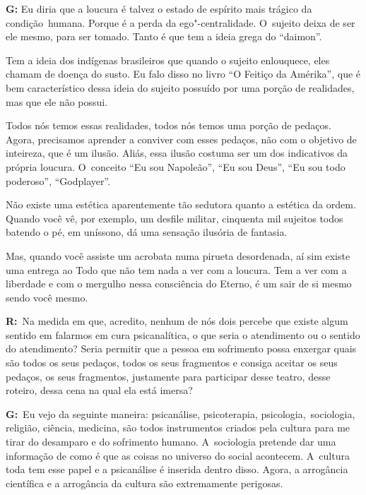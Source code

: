  

\textbf{G:} Eu diria que a loucura é talvez o estado de espírito mais
trágico da condição\textbf{}~humana. Porque é a perda da
ego"-centralidade. O~sujeito deixa de ser ele mesmo, para ser tomado.
Tanto é que tem a ideia grega do ``daimon''.

 

Tem a ideia dos indígenas brasileiros que quando o sujeito enlouquece,
eles chamam de doença do susto. Eu falo disso no livro ``O Feitiço da
Amérika'', que é bem característico dessa ideia do sujeito possuído
por uma porção de realidades, mas que ele não possui.

 

Todos nós temos essas realidades, todos nós temos uma porção de pedaços.
Agora, precisamos aprender a conviver com esses pedaços, não com o
objetivo de inteireza, que é um ilusão. Aliás, essa ilusão costuma ser
um dos indicativos da própria loucura. O~conceito ``Eu sou
Napoleão'', ``Eu sou Deus'', ``Eu sou todo poderoso'', ``Godplayer''.

 

Não existe uma estética aparentemente tão sedutora quanto a estética da
ordem. Quando você vê, por exemplo, um desfile militar, cinquenta mil
sujeitos todos batendo o pé, em uníssono, dá uma sensação ilusória de
fantasia.

 

Mas, quando você assiste um acrobata numa pirueta desordenada, aí sim
existe uma entrega ao Todo que não tem nada a ver com a loucura. Tem a
ver com a liberdade e com o mergulho nessa consciência do Eterno, é um
sair de si mesmo sendo você mesmo.

 

\textbf{R:}~Na medida em que, acredito, nenhum de nós dois percebe que
existe algum sentido em falarmos em cura psicanalítica, o que seria o
atendimento ou o sentido do atendimento? Seria permitir que a pessoa em
sofrimento possa enxergar quais são todos os seus pedaços, todos os seus
fragmentos e consiga aceitar os seus pedaços, os seus fragmentos,
justamente para participar desse teatro, desse roteiro, dessa cena na
qual ela está imersa?

 

\textbf{G:}~Eu vejo da seguinte maneira: psicanálise, psicoterapia,
psicologia,\textbf{}~sociologia, religião, ciência, medicina, são todos
instrumentos criados pela cultura para me tirar do desamparo e do
sofrimento humano. A~sociologia pretende dar uma informação de como é
que as coisas no universo do social acontecem. A~cultura toda tem esse
papel e a psicanálise é inserida dentro disso. Agora, a arrogância
científica e a arrogância da cultura são extremamente perigosas.

